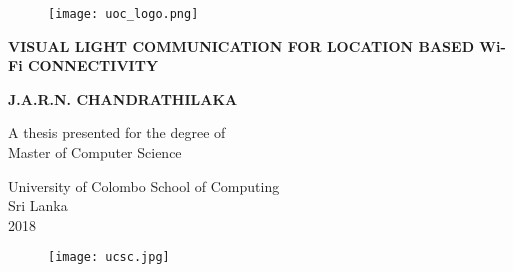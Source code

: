 \begin{titlepage}
    \begin{center}
        \vspace*{0.1cm}
        
        \begin{figure}[h]
        	\centering
        	\texttt{[image: uoc\_logo.png]}
        \end{figure}
        
        \Huge
        \textbf{VISUAL LIGHT COMMUNICATION FOR LOCATION BASED Wi-Fi CONNECTIVITY}
        

        
        \vspace{1.5cm}
        
        \large
        \textbf{J.A.R.N. CHANDRATHILAKA}
        
        \vfill
        
        A thesis presented for the degree of\\
        Master of Computer Science
        
        \vspace{0.8cm}
        
        
        University of Colombo School of Computing\\
        Sri Lanka\\
        2018
        \begin{figure}[h]
        	\centering
        	\texttt{[image: ucsc.jpg]}
        \end{figure}
        
    \end{center}
\end{titlepage}